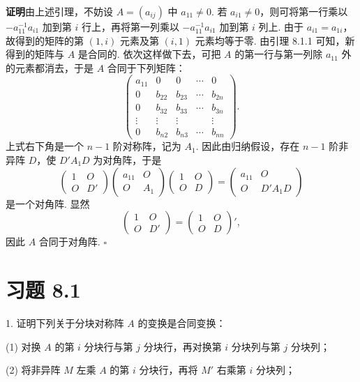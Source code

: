 \documentclass[UTF8,12pt,a4paper,fontset=fandol]{ctexart}
\begin{document}
\noindent\textbf{证明}\quad 由上述引理，不妨设 $A=(a_{ij})$ 中 $a_{11}\neq0$. 若 $a_{i1}\neq0$，则可将第一行乘以 $-a_{11}^{-1}a_{i1}$ 加到第 $i$ 行上，再将第一列乘以 $-a_{11}^{-1}a_{i1}$ 加到第 $i$ 列上. 由于 $a_{i1}=a_{1i}$，故得到的矩阵的第 $(1,i)$ 元素及第 $(i,1)$ 元素均等于零. 由引理 8.1.1 可知，新得到的矩阵与 $A$ 是合同的. 依次这样做下去，可把 $A$ 的第一行与第一列除 $a_{11}$ 外的元素都消去，于是 $A$ 合同于下列矩阵：
\[
\left(\begin{array}{ccccc}
a_{11}&0&0&\cdots&0\\
0&b_{22}&b_{23}&\cdots&b_{2n}\\
0&b_{32}&b_{33}&\cdots&b_{3n}\\
\vdots&\vdots&\vdots&&\vdots\\
0&b_{n2}&b_{n3}&\cdots&b_{nn}
\end{array}\right).
\]
上式右下角是一个 $n-1$ 阶对称阵，记为 $A_1$. 因此由归纳假设，存在 $n-1$ 阶非异阵 $D$，使 $D'A_1D$ 为对角阵，于是
\[
\left(\begin{array}{cc}
1&O\\
O&D'
\end{array}\right)
\left(\begin{array}{cc}
a_{11}&O\\
O&A_1
\end{array}\right)
\left(\begin{array}{cc}
1&O\\
O&D
\end{array}\right)
=
\left(\begin{array}{cc}
a_{11}&O\\
O&D'A_1D
\end{array}\right)
\]
是一个对角阵. 显然
\[
\left(\begin{array}{cc}
1&O\\
O&D'
\end{array}\right)
=
\left(\begin{array}{cc}
1&O\\
O&D
\end{array}\right)' ,
\]
因此 $A$ 合同于对角阵. $\square$

\section*{习题 8.1}

1. 证明下列关于分块对称阵 $A$ 的变换是合同变换：

(1) 对换 $A$ 的第 $i$ 分块行与第 $j$ 分块行，再对换第 $i$ 分块列与第 $j$ 分块列；

(2) 将非异阵 $M$ 左乘 $A$ 的第 $i$ 分块行，再将 $M'$ 右乘第 $i$ 分块列；
\end{document}
